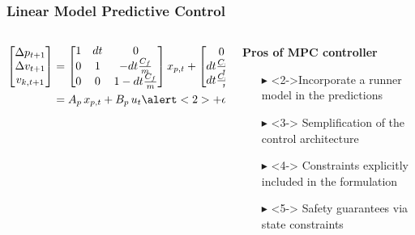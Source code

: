 \documentclass[9pt, aspectratio=169]{beamer}
\begin{document}
\begin{frame}
\frametitle{Linear Model Predictive Control}
\begin{columns}
\begin{column}{0.6\textwidth}
\begin{equation*}
\begin{aligned}
        \begin{bmatrix}
            \Delta p_{t+1}  \\
            \Delta v_{t+1} \\
            v_{k,t+1}
        \end{bmatrix}
        & =
        \begin{bmatrix}
            1 & dt & 0 \\
            0 & 1 & -dt\frac{C_f}{m} \\
            0 & 0 & 1-dt\frac{C_f}{m}
        \end{bmatrix}
        x_{p,t}
        +
        \begin{bmatrix}
            0 \\
            dt \frac{C_{m1}}{m} \\
            dt \frac{C_{m1}}{m}
        \end{bmatrix}
        u_t + 
	 \alert<2>{
        \begin{bmatrix}
        0 \\
        - dt a_{r,t} \\
        0
        \end{bmatrix} }\\
        & = A_p \, x_{p,t} + B_p \, u_t \alert<2>{+ a_t}
\end{aligned}
\end{equation*}
\end{column}

\begin{column}{0.43\textwidth}
\begin{block}{}
\centering
\textcolor{mygreen}{\textbf{Pros of MPC controller}} 
\begin{itemize}
	\footnotesize
	\item[$\blacktriangleright$] <2->Incorporate a runner model in the predictions
	\item[$\blacktriangleright$] <3-> Semplification of the control architecture
	\item[$\blacktriangleright$] <4-> Constraints explicitly included in the formulation
	\item[$\blacktriangleright$] <5-> Safety guarantees via state constraints


\end{itemize}
\end{block}
\end{column}
\end{columns}
\end{frame}
\end{document}

